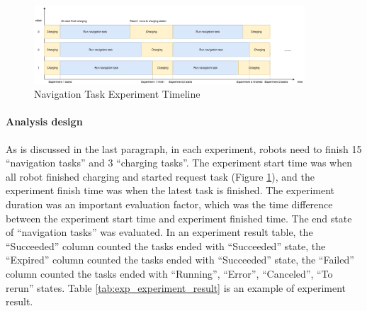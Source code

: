 

\begin{figure}[htbp]
 \centering
 \includegraphics[width = 0.9\textwidth]{content/images/ch5/exe_exp_timeline.drawio.png}
 \caption{Navigation Task Experiment Timeline}
 \label{fig:navigation_task_experiment_timeline}
\end{figure}


\paragraph{Analysis design}
As is discussed in the last paragraph, in each experiment, robots need to finish 15 ``navigation tasks'' and 3 ``charging tasks''.
The experiment start time was when all robot finished charging and started request task (Figure \ref{fig:navigation_task_experiment_timeline}), and the experiment finish time was when the latest task is finished.
The experiment duration was an important evaluation factor, which was the time difference between the experiment start time and experiment finished time. 
The end state of ``navigation tasks'' was evaluated. In an experiment result table, the ``Succeeded'' column counted the tasks ended with ``Succeeded'' state, the ``Expired'' column counted the tasks ended with ``Succeeded'' state, the ``Failed'' column counted the tasks ended with ``Running'', ``Error'', ``Canceled'', ``To rerun'' states. 
Table \ref{tab:exp_experiment_result} is an example of experiment result. 


